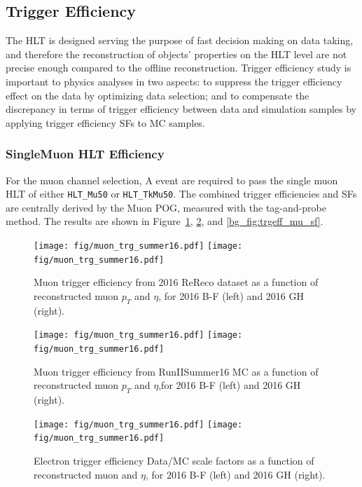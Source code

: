 \subsection{Trigger Efficiency}\label{sec:bkg_trig}
The HLT is designed serving the purpose of fast decision making on data taking, and therefore the reconstruction of objects' properties on the HLT level are not precise enough compared to the offline reconstruction. Trigger efficiency study is important to physics analyses in two aspects: to suppress the trigger efficiency effect on the data by optimizing data selection; and to compensate the discrepancy in terms of trigger efficiency between data and simulation samples by applying trigger efficiency SFs to MC samples.
\subsubsection{SingleMuon HLT Efficiency}
For the muon channel selection, A event are required to pass the single muon HLT of either \texttt{HLT\_Mu50} or \texttt{HLT\_TkMu50}. The combined trigger efficiencies and SFs are centrally derived by the Muon POG, measured with the tag-and-probe method. The results are shown in Figure~\ref{fig:bg_trgeff_mu_dt}, \ref{fig:bg_trgeff_mu_mc}, and \ref{bg_fig:trgeff_mu_sf}.

\begin{figure}[htpb]
\begin{center}
\texttt{[image: fig/muon\_trg\_summer16.pdf]}
\texttt{[image: fig/muon\_trg\_summer16.pdf]}
\caption{Muon trigger efficiency from 2016 ReReco dataset as a function of reconstructed muon $p_T$ and $\eta$, for 2016 B-F (left) and 2016 GH (right). }
\label{fig:bg_trgeff_mu_dt}
\end{center}
\end{figure}

\begin{figure}[htpb]
\begin{center}
\texttt{[image: fig/muon\_trg\_summer16.pdf]}
\texttt{[image: fig/muon\_trg\_summer16.pdf]}
\caption{Muon trigger efficiency from  RunIISummer16 MC as a function of reconstructed muon $p_T$ and $\eta$,for 2016 B-F (left) and 2016 GH (right). }
\label{fig:bg_trgeff_mu_mc}
\end{center}
\end{figure}

\begin{figure}[htpb]
\begin{center}
\texttt{[image: fig/muon\_trg\_summer16.pdf]}
\texttt{[image: fig/muon\_trg\_summer16.pdf]}
\caption{Electron trigger efficiency Data/MC scale factors  as a function of reconstructed muon \pt and $\eta$, for 2016 B-F (left) and 2016 GH (right). }
\label{fig:bg_trgeff_mu_sf}
\end{center}
\end{figure}

